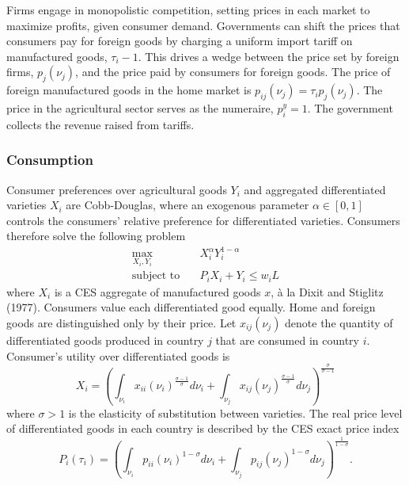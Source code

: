 \documentclass{puthesis}
\begin{document}
Firms engage in monopolistic competition, setting prices in each market
to maximize profits, given consumer demand. Governments can shift the
prices that consumers pay for foreign goods by charging a uniform import
tariff on manufactured goods, \(\tau_i - 1\). This drives a wedge
between the price set by foreign firms, \(p_j(\nu_j)\), and the price
paid by consumers for foreign goods. The price of foreign manufactured
goods in the home market is \(p_{ij}(\nu_j) = \tau_i p_j(\nu_j)\). The
price in the agricultural sector serves as the numeraire, \(p_i^y = 1\).
The government collects the revenue raised from tariffs.

\subsubsection{Consumption}

Consumer preferences over agricultural goods \(Y_i\) and aggregated
differentiated varieties \(X_i\) are Cobb-Douglas, where an exogenous
parameter \(\alpha \in [0,1]\) controls the consumers' relative
preference for differentiated varieties. Consumers therefore solve the
following problem \begin{equation} \label{eq:cMax}
\begin{split}
\max_{X_i, Y_i} & \quad X_i^\alpha Y_i^{1 - \alpha} \\
\text{subject to} & \quad P_i X_i + Y_i \leq w_i L
\end{split}
\end{equation} where \(X_i\) is a CES aggregate of manufactured goods
\(x\), à la Dixit and Stiglitz (1977). Consumers value each
differentiated good equally. Home and foreign goods are distinguished
only by their price. Let \(x_{ij}(\nu_j)\) denote the quantity of
differentiated goods produced in country \(j\) that are consumed in
country \(i\). Consumer's utility over differentiated goods is
\begin{equation} \label{eq:CES}
X_i = \left( \int_{\nu_i} x_{ii}(\nu_i)^{\frac{\sigma - 1}{\sigma}} d \nu_i + \int_{\nu_j} x_{ij}(\nu_j)^{\frac{\sigma - 1}{\sigma}} d \nu_j \right)^{\frac{\sigma}{\sigma - 1}}
\end{equation} where \(\sigma > 1\) is the elasticity of substitution
between varieties. The real price level of differentiated goods in each
country is described by the CES exact price index
\begin{equation} \label{eq:P}
P_i(\tau_i) = \left( \int_{\nu_i} p_{ii}(\nu_i)^{1-\sigma} d \nu_i + \int_{\nu_j} p_{ij}(\nu_j)^{1-\sigma} d \nu_j \right)^{\frac{1}{1 - \sigma}} .
\end{equation}
\end{document}
